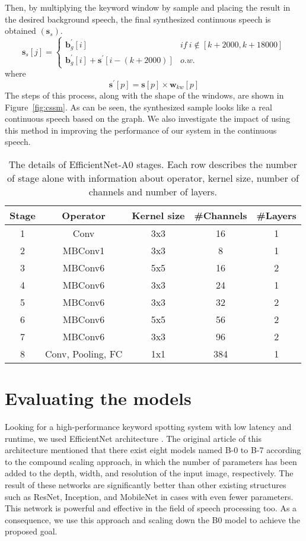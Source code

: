 \documentclass{article}
\begin{document}
Then, by multiplying the keyword window by sample and placing the result in the desired background speech, the final synthesized continuous speech is obtained $(\textbf{s}_s)$.
\begin{equation}
\textbf{s}_s[j] = \begin{cases}
\textbf{b}^\prime_g[i] & if\ i \notin [k+2000,k+18000]\\
\textbf{b}^\prime_g[i]+ \textbf{s}^\prime[i-(k+2000)] & o.w.\end{cases}
\end{equation}
where
\begin{equation*}
\textbf{s}^\prime[p] = \textbf{s}[p] \times \textbf{w}_{kw}[p]
\end{equation*}
 The steps of this process, along with the shape of the windows, are shown in Figure~\ref{fig:cssm}. As can be seen, the synthesized sample looks like a real continuous speech based on the graph. We also investigate the impact of using this method in improving the performance of our system in the continuous speech.

\begin{table}[h]\centering
\caption{The details of EfficientNet-A0 stages. Each row describes the number of stage alone with information about operator, kernel size, number of channels and number of layers.}

\label{tbl:effa0}
\begin{tabular}{c|cccc}
\hline
Stage  & Operator & Kernel size & \#Channels & \#Layers \\
\hline
1 & Conv & 3x3 & 16 & 1\\
2 & MBConv1 & 3x3 & 8 & 1\\
3 & MBConv6 & 5x5 & 16 & 2\\
4 & MBConv6 & 3x3 & 24 & 1\\
5 & MBConv6 & 3x3 & 32 & 2\\
6 & MBConv6 & 5x5 & 56 & 2\\
7 & MBConv6 & 3x3 & 96 & 2\\
8 & Conv, Pooling, FC & 1x1 & 384 & 1\\
\hline
\end{tabular}
\end{table}

\section{Evaluating the models}
Looking for a high-performance keyword spotting system with low latency and runtime, we used EfficientNet architecture \cite{eff}. The original article of this architecture mentioned that there exist eight models named B-0 to B-7 according to the compound scaling approach, in which the number of parameters has been added to the depth, width, and resolution of the input image, respectively. The result of these networks are significantly better than other existing structures such as ResNet, Inception, and MobileNet in cases with even fewer parameters. This network is powerful and effective in the field of speech processing too. As a consequence, we use this approach and scaling down the B0 model to achieve the proposed goal.
\end{document}
